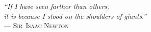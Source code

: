 {\color{red}
{\sffamily\itshape
``If I have seen farther than others,\\
it is because I stood on the shoulders of giants.''\\}
--- \textsc{Sir~Isaac Newton}}
